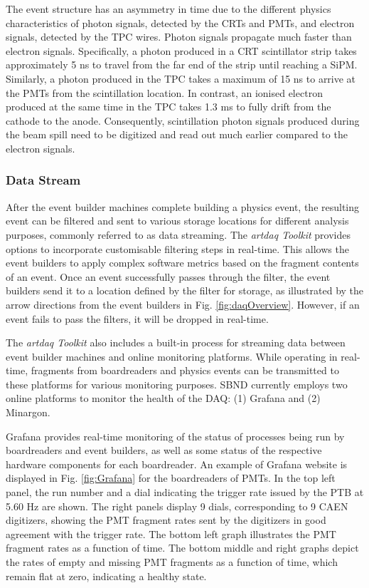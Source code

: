 The event structure has an asymmetry in time due to the different physics characteristics of photon signals, detected by the CRTs and PMTs, and electron signals, detected by the TPC wires. 
Photon signals propagate much faster than electron signals.
Specifically, a photon produced in a CRT scintillator strip takes approximately 5 ns to travel from the far end of the strip until reaching a SiPM. 
Similarly, a photon produced in the TPC takes a maximum of 15 ns to arrive at the PMTs from the scintillation location.
In contrast, an ionised electron produced at the same time in the TPC takes 1.3 ms to fully drift from the cathode to the anode. 
Consequently, scintillation photon signals produced during the beam spill need to be digitized and read out much earlier compared to the electron signals.

\subsubsection{Data Stream}

After the event builder machines complete building a physics event, the resulting event can be filtered and sent to various storage locations for different analysis purposes, commonly referred to as data streaming.
The \textit{artdaq Toolkit} provides options to incorporate customisable filtering steps in real-time. 
This allows the event builders to apply complex software metrics based on the fragment contents of an event. 
Once an event successfully passes through the filter, the event builders send it to a location defined by the filter for storage, as illustrated by the arrow directions from the event builders in Fig. \ref{fig:daqOverview}. 
However, if an event fails to pass the filters, it will be dropped in real-time.

The \textit{artdaq Toolkit} also includes a built-in process for streaming data between event builder machines and online monitoring platforms.
While operating in real-time, fragments from boardreaders and physics events can be transmitted to these platforms for various monitoring purposes. 
SBND currently employs two online platforms to monitor the health of the DAQ: (1) Grafana and (2) Minargon.

Grafana provides real-time monitoring of the status of processes being run by boardreaders and event builders, as well as some status of the respective hardware components for each boardreader. 
An example of Grafana website is displayed in Fig. \ref{fig:Grafana} for the boardreaders of PMTs.
In the top left panel, the run number and a dial indicating the trigger rate issued by the PTB at 5.60 Hz are shown. 
The right panels display 9 dials, corresponding to 9 CAEN digitizers, showing the PMT fragment rates sent by the digitizers in good agreement with the trigger rate.
The bottom left graph illustrates the PMT fragment rates as a function of time. 
The bottom middle and right graphs depict the rates of empty and missing PMT fragments as a function of time, which remain flat at zero, indicating a healthy state.


